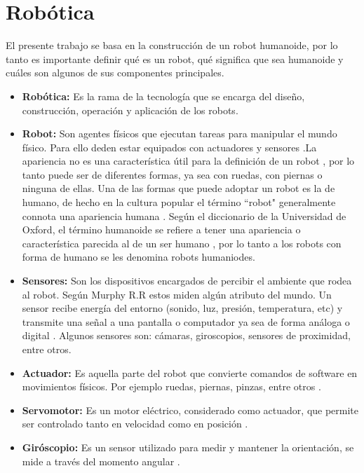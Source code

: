\section{Robótica} \label{sect:robotica}
 
El presente trabajo se basa en la construcción de un robot humanoide, por lo tanto es importante definir qué es un robot, qué significa que sea humanoide y cuáles son algunos de sus componentes principales.

\begin{itemize}
\item{\textbf{Robótica:} Es la rama de la tecnología que se encarga del diseño, construcción, operación y aplicación de los robots. \cite{oxfordRobotics}}

\item{\textbf{Robot:} Son agentes físicos que ejecutan tareas para manipular el mundo físico. Para ello deden estar equipados con actuadores y sensores \cite{peterAndNorvig}.La apariencia no es una característica útil para la definición de un robot \cite{AiRobotics}, por lo tanto puede ser de diferentes formas, ya sea con ruedas, con piernas o ninguna de ellas. Una de las formas que puede adoptar un robot es la de humano, de hecho en la cultura popular el término ``robot" generalmente connota una apariencia humana \cite{AiRobotics}. Según el diccionario de la Universidad de Oxford,  el término humanoide se refiere a tener una apariencia o característica parecida al de un ser humano \cite{oxfordRobotics}, por lo tanto a los robots con forma de humano se les denomina robots humaniodes.}    

\item{\textbf{Sensores:}  Son los dispositivos encargados de percibir el ambiente que rodea al robot. Según Murphy R.R estos miden algún atributo del mundo. Un sensor recibe energía del entorno (sonido, luz, presión, temperatura, etc) y transmite una señal a una pantalla o computador ya sea de forma análoga o digital \cite{AiRobotics}. Algunos sensores son: cámaras, giroscopios, sensores de proximidad, entre otros.}

\item{\textbf{Actuador:}  Es aquella parte del robot que convierte comandos de software en movimientos físicos. Por ejemplo ruedas, piernas, pinzas, entre otros \cite{peterNorvig}.}

\item{\textbf{Servomotor:}  Es un motor eléctrico, considerado como actuador, que permite ser controlado tanto en velocidad como en posición \cite{AiRobotics}. }


\item{\textbf{Giróscopio:} Es un sensor utilizado para medir y mantener la orientación, se mide a través del momento angular \cite{gyro1}. }
\end{itemize}

